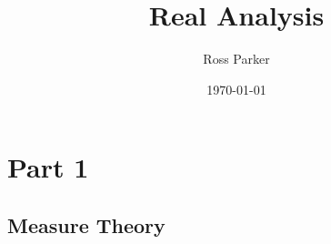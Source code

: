 \documentclass[mytheorems]{SIAMbook2019}
\title{Real Analysis}
\author{Ross Parker}
\date{\today}
\theoremstyle{plain}
\theoremstyle{definition}
\begin{document}
\maketitle
\frontmatter
\tableofcontents




\mainmatter
\part{Part 1}

\chapter[Measure Theory]%
{Measure Theory}







\end{document}
